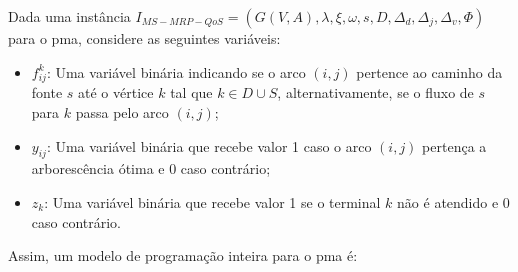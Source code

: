Dada uma instância  $I_{MS-MRP-QoS} = (G(V, A),  \lambda, \xi, \omega,
s,  D, \Delta_{d},  \Delta_{j}, \Delta_{v},  \Phi)$ para  o \gls{pma},
considere as seguintes variáveis:

\begin{itemize}
 \item $f_{ij}^{k}$: Uma variável binária indicando se o arco $(i, j)$
   pertence ao caminho da fonte $s$ até o vértice $k$ tal que $k \in D
   \cup S$,  alternativamente, se o fluxo  de $s$ para $k$  passa pelo
   arco $(i, j)$;
 \item $y_{ij}$: Uma  variável binária que recebe valor 1  caso o arco
   $(i, j)$ pertença a arborescência ótima e 0 caso contrário;
 \item $z_{k}$: Uma variável binária que  recebe valor 1 se o terminal
   $k$ não é atendido e 0 caso contrário.
\end{itemize}

Assim, um modelo de programação inteira para o \gls{pma} é:

